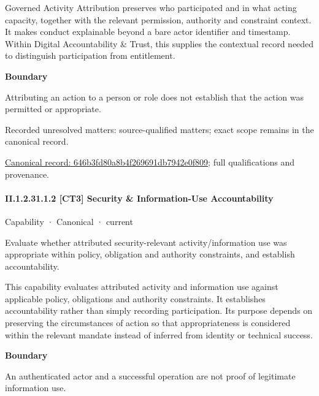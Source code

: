 Governed Activity Attribution preserves who participated and in what acting capacity, together with the relevant permission, authority and constraint context. It makes conduct explainable beyond a bare actor identifier and timestamp. Within Digital Accountability \& Trust, this supplies the contextual record needed to distinguish participation from entitlement.



\textbf{Boundary}



Attributing an action to a person or role does not establish that the action was permitted or appropriate.


{\small Recorded unresolved matters: source-qualified matters; exact scope remains in the canonical record.}\par
{\footnotesize \href{../../../../continuum/strategy/capability/646b3fd80a8b4f269691db7942e0f809.md}{Canonical record: 646b3fd80a8b4f269691db7942e0f809}; full qualifications and provenance.}\par
\paragraph*{II.1.2.31.1.2 [CT3] Security \& Information-Use Accountability}
\label{navigation:II.1.2.31.1.2}

\label{element:a33d0cc14c384bd48012def4ded54a67}
{\small Capability · Canonical · current}\par

Evaluate whether attributed security-relevant activity/information use was appropriate within policy, obligation and authority constraints, and establish accountability.



This capability evaluates attributed activity and information use against applicable policy, obligations and authority constraints. It establishes accountability rather than simply recording participation. Its purpose depends on preserving the circumstances of action so that appropriateness is considered within the relevant mandate instead of inferred from identity or technical success.



\textbf{Boundary}



An authenticated actor and a successful operation are not proof of legitimate information use.


